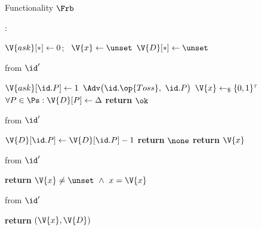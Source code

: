 \begin{interface}[nofloat]{Functionality $\Frb$ \\
\params{$\PID$, \quad $\Ps$, \quad $\admits$, \quad
$\uses := \{(\Adv,\serves)\}$, \quad $\pars := \Delta$}}

{\scriptsize
\setlength{\columnsep}{1.4em}
\begin{multicols}{2}
:
\begin{algorithmic}[1]
\setcounter{contline}{0}\algcont
\State $\V{ask}[*] \gets 0$; \ $\V{x} \gets \unset$
\State $\V{D}[*] \gets \unset$
\algsave
\end{algorithmic}
\vspace{1.4ex}

 \quad from $\id'$
\begin{algorithmic}[1]
\algcont
\State $\V{ask}[\id.P] \gets 1$
\State $\Adv\bigl(\id.\op{Toss},\ \id.P\bigr)$
 \label{ln:rbquorum}
    \State $\V{x} \gets_{\$} \{0,1\}^{\tau}$ \label{ln:rbdraw}
    \State $\forall P \in \Ps : \V{D}[P] \gets \Delta$ \label{ln:rbdelay}
  \EndIf
\EndIf
\State \textbf{return} $\ok$
\algsave
\end{algorithmic}
\vspace{1.4ex}

 \quad from $\id'$
\begin{algorithmic}[1]
\algcont
{} \label{ln:rbnotyet}
  \State $\V{D}[\id.P] \gets \V{D}[\id.P] - 1$ \label{ln:rbtick}
  \State \textbf{return} $\none$
\EndIf
\State \textbf{return} $\V{x}$ \label{ln:rbout}
\algsave
\end{algorithmic}
\vspace{1.4ex}

\columnbreak

 \quad from $\id'$
\begin{algorithmic}[1]
\algcont
\State \textbf{return} $\V{x} \neq \unset \ \wedge\ x = \V{x}$ \label{ln:rbverify}
\algsave
\end{algorithmic}
\vspace{1.4ex}

 \quad from $\id'$
\begin{algorithmic}[1]
\algcont
\State \textbf{return} $(\V{x}, \V{D})$ \label{ln:rbleak}
\algsave
\end{algorithmic}
\end{multicols}}
\end{interface}
